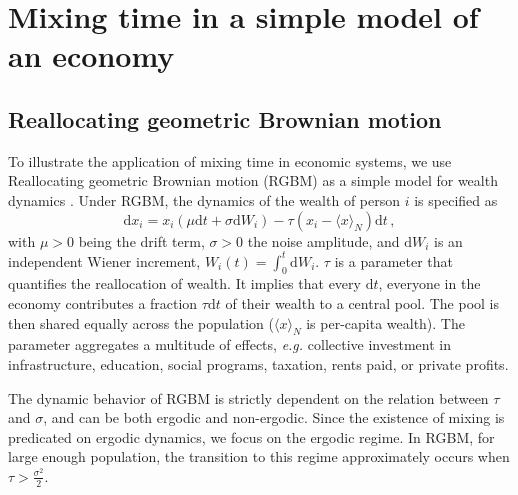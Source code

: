 \documentclass[11pt]{article}
\newcommand{\eg}{{\it e.g.}\xspace}
\newcommand{\be}{\begin{equation}}
\newcommand{\ee}{\end{equation}}
\numberwithin{equation}{section}
\begin{document}
\section{Mixing time in a simple model of an economy}\label{sec:rgbm}
\subsection{Reallocating geometric Brownian motion}

To illustrate the application of mixing time in economic systems, we use Reallocating geometric Brownian motion (RGBM) as a simple model for wealth dynamics \citep{BermanPetersAdamou2019}. Under RGBM, the dynamics of the wealth of person $i$ is specified as
%
\be
\mathrm{d} x_i = x_i \left( \mu \mathrm{d}t + \sigma \mathrm{d}W_i \right) - \tau \left( x_i - \langle x \rangle_N \right) \mathrm{d}t\,,
\label{eq:rgbm}
\ee
%
with $\mu > 0$ being the drift term, $\sigma > 0$ the noise amplitude, and $\mathrm{d}W_i$ is an independent Wiener increment, $W_i(t) =\int_0^t \mathrm{d}W_i$. $\tau$ is a parameter that quantifies the reallocation of wealth. It implies that every $\mathrm{d}t$, everyone in the economy contributes a fraction $\tau\mathrm{d}t$ of their wealth to a central pool. The pool is then shared equally across the population ($\langle x \rangle_N$ is per-capita wealth). The parameter aggregates a multitude of effects, \eg collective investment in infrastructure, education, social programs, taxation, rents paid, or private profits.

The dynamic behavior of RGBM is strictly dependent on the relation between $\tau$ and $\sigma$, and can be both ergodic and non-ergodic. Since the existence of mixing is predicated on ergodic dynamics, we focus on the ergodic regime. In RGBM, for large enough population, the transition to this regime approximately occurs when $\tau > \frac{\sigma^2}{2}$.
\end{document}
